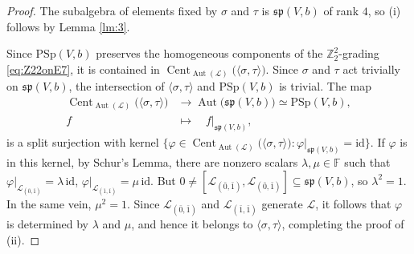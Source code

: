 \documentclass[a4paper,reqno]{amsart}
\theoremstyle{definition}
\numberwithin{theorem}{section}
\numberwithin{equation}{section}
\begin{document}
\begin{proof}
The subalgebra of elements fixed by $\sigma$ and $\tau$ is ${{\mathfrak{sp}}}(V,b)$ of rank $4$, so (i) follows by Lemma \ref{lm:3}.

Since ${\mathrm{PSp}}(V,b)$ preserves the homogeneous components of the ${\mathbb{Z}}_2^2$-grading \eqref{eq:Z22onE7}, it is contained in $\operatorname{\mathrm{Cent}}_{\operatorname{\mathrm{Aut}}({\mathcal{L}})}\bigl(\langle \sigma,\tau\rangle\bigr)$. Since $\sigma$ and $\tau$ act trivially on ${\mathfrak{sp}}(V,b)$, the intersection of $\langle \sigma,\tau\rangle$ and ${\mathrm{PSp}}(V,b)$ is trivial. The map
\[
\begin{split}
\operatorname{\mathrm{Cent}}_{\operatorname{\mathrm{Aut}}({\mathcal{L}})}\bigl(\langle \sigma,\tau\rangle\bigr)&\longrightarrow \operatorname{\mathrm{Aut}}\bigl({{\mathfrak{sp}}}(V,b)\bigr)\simeq {\mathrm{PSp}}(V,b),\\
f\quad&\mapsto\quad f\vert_{{{\mathfrak{sp}}}(V,b)},
\end{split}
\]
is a split surjection with kernel $\{\varphi\in\operatorname{\mathrm{Cent}}_{\operatorname{\mathrm{Aut}}({\mathcal{L}})}\bigl(\langle \sigma,\tau\rangle\bigr):
 \varphi\vert_{{{\mathfrak{sp}}}(V,b)}={\mathrm{id}}\}$. If $\varphi$ is in this kernel, by Schur's Lemma, there are nonzero scalars $\lambda,\mu\in{\mathbb{F}}$ such that $\varphi\vert_{{\mathcal{L}}_{(\bar 0,\bar 1)}}=\lambda\,{\mathrm{id}}$, $\varphi\vert_{{\mathcal{L}}_{(\bar 1,\bar 1)}}=\mu\,{\mathrm{id}}$. But $0\ne [{\mathcal{L}}_{(\bar 0,\bar 1)},{\mathcal{L}}_{(\bar 0,\bar 1)}]\subseteq {{\mathfrak{sp}}}(V,b)$, so  $\lambda^2=1$. In the same vein, $\mu^2=1$. Since ${\mathcal{L}}_{(\bar 0,\bar 1)}$ and ${\mathcal{L}}_{(\bar 1,\bar 1)}$ generate ${\mathcal{L}}$, it follows that $\varphi$ is determined by $\lambda$ and $\mu$, and hence it belongs to $\langle\sigma,\tau\rangle$, completing the proof of (ii).


\end{proof}
\end{document}
